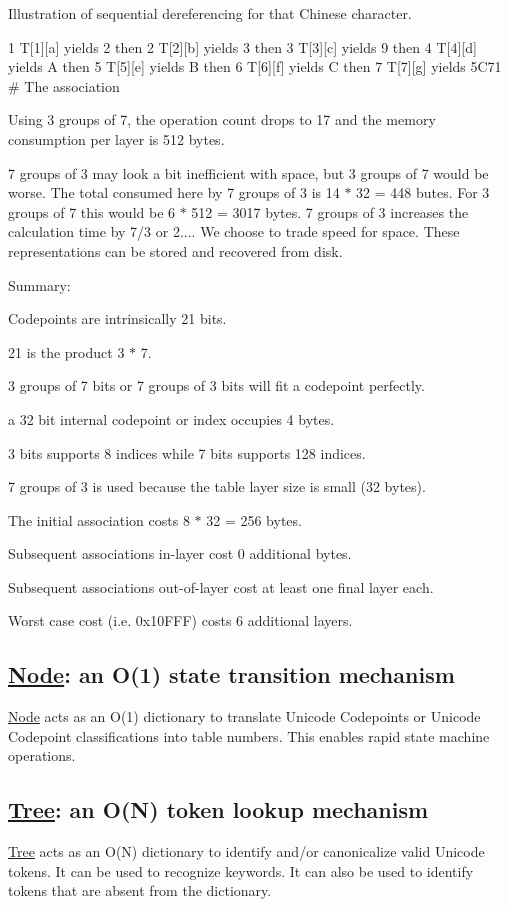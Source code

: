 Illustration of sequential dereferencing for that Chinese character. 
\begin{DoxyCode}
1 T[1][a] yields 2 then
2 T[2][b] yields 3 then
3 T[3][c] yields 9 then
4 T[4][d] yields A then
5 T[5][e] yields B then
6 T[6][f] yields C then
7 T[7][g] yields 5C71  # The association
\end{DoxyCode}


Using 3 groups of 7, the operation count drops to 17 and the memory consumption per layer is 512 bytes.

7 groups of 3 may look a bit inefficient with space, but 3 groups of 7 would be worse. The total consumed here by 7 groups of 3 is 14 $\ast$ 32 = 448 butes. For 3 groups of 7 this would be 6 $\ast$ 512 = 3017 bytes. 7 groups of 3 increases the calculation time by 7/3 or 2.... We choose to trade speed for space. These representations can be stored and recovered from disk.

Summary\+:
\begin{DoxyItemize}
\item Codepoints are intrinsically 21 bits.
\item 21 is the product 3 $\ast$ 7.
\item 3 groups of 7 bits or 7 groups of 3 bits will fit a codepoint perfectly.
\item a 32 bit internal codepoint or index occupies 4 bytes.
\item 3 bits supports 8 indices while 7 bits supports 128 indices.
\item 7 groups of 3 is used because the table layer size is small (32 bytes).
\item The initial association costs 8 $\ast$ 32 = 256 bytes.
\item Subsequent associations in-\/layer cost 0 additional bytes.
\item Subsequent associations out-\/of-\/layer cost at least one final layer each.
\item Worst case cost (i.\+e. 0x10\+F\+F\+F) costs 6 additional layers.
\end{DoxyItemize}

\subsection*{\hyperlink{class_node}{Node}\+: an O(1) state transition mechanism}

\hyperlink{class_node}{Node} acts as an O(1) dictionary to translate Unicode Codepoints or Unicode Codepoint classifications into table numbers. This enables rapid state machine operations.

\subsection*{\hyperlink{class_tree}{Tree}\+: an O(\+N) token lookup mechanism}

\hyperlink{class_tree}{Tree} acts as an O(\+N) dictionary to identify and/or canonicalize valid Unicode tokens. It can be used to recognize keywords. It can also be used to identify tokens that are absent from the dictionary. 